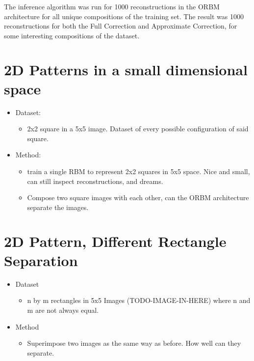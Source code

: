 The inference algorithm was run for 1000 reconstructions in the ORBM architecture for all unique compositions of the training set. The result was 1000 reconstructions for both the Full Correction and Approximate Correction, for some interesting compositions of the dataset.



\section{2D Patterns in a small dimensional space}



\begin{itemize}
    \item Dataset:
    \begin{itemize}
      \item 2x2 square in a 5x5 image. Dataset of every possible configuration of said square.
    \end{itemize}
    \item Method:
    \begin{itemize}
      \item train a single RBM to represent 2x2 squares in 5x5 space. Nice and small, can still inspect reconstructions, and dreams.
      \item Compose two square images with each other, can the ORBM architecture separate the images.
    \end{itemize}
  \end{itemize}

    \section{2D Pattern, Different Rectangle Separation}
    \begin{itemize}
      \item Dataset
      \begin{itemize}
        \item n by m rectangles in 5x5 Images (TODO-IMAGE-IN-HERE) where n and m are not always equal.
      \end{itemize}
      \item Method
      \begin{itemize}
        \item Superimpose two images as the same way as before. How well can they separate.
      \end{itemize}
    \end{itemize}

